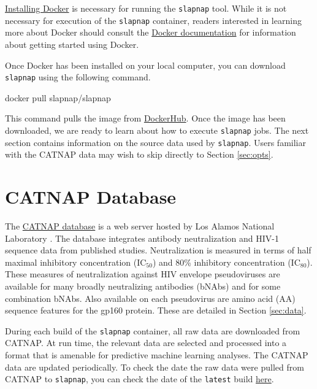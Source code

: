 \documentclass[]{article}
\newenvironment{Shaded}{\begin{snugshade}}{\end{snugshade}}
\newcommand{\ExtensionTok}[1]{#1}
\newcommand{\NormalTok}[1]{#1}
\begin{document}
\href{https://docs.docker.com/docker-for-windows/install/}{Installing
Docker} is necessary for running the \texttt{slapnap} tool. While it is
not necessary for execution of the \texttt{slapnap} container, readers
interested in learning more about Docker should consult the
\href{https://docs.docker.com/get-started/}{Docker documentation} for
information about getting started using Docker.

Once Docker has been installed on your local computer, you can download
\texttt{slapnap} using the following command.

\begin{Shaded}
\begin{Highlighting}[]
\ExtensionTok{docker}\NormalTok{ pull slapnap/slapnap}
\end{Highlighting}
\end{Shaded}

This command pulls the image from
\href{https://hub.docker.com/}{DockerHub}. Once the image has been
downloaded, we are ready to learn about how to execute \texttt{slapnap}
jobs. The next section contains information on the source data used by
\texttt{slapnap}. Users familiar with the CATNAP data may wish to skip
directly to Section \ref{sec:opts}.

\section{CATNAP Database}\label{sec:catnap}

The
\href{https://www.hiv.lanl.gov/components/sequence/HIV/neutralization/index.html}{CATNAP
database} is a web server hosted by Los Alamos National Laboratory
\citep{yoon2015catnap}. The database integrates antibody neutralization
and HIV-1 sequence data from published studies. Neutralization is
measured in terms of half maximal inhibitory concentration (IC\(_50\))
and 80\% inhibitory concentration (IC\(_80\)). These measures of
neutralization against HIV envelope pseudoviruses are available for many
broadly neutralizing antibodies (bNAbs) and for some combination bNAbs.
Also available on each pseudovirus are amino acid (AA) sequence features
for the gp160 protein. These are detailed in Section \ref{sec:data}.

During each build of the \texttt{slapnap} container, all raw data are
downloaded from CATNAP. At run time, the relevant data are selected and
processed into a format that is amenable for predictive machine learning
analyses. The CATNAP data are updated periodically. To check the date
the raw data were pulled from CATNAP to \texttt{slapnap}, you can check
the date of the \texttt{latest} build
\href{https://hub.docker.com/repository/registry-1.docker.io/slapnap/slapnap/tags?page=1}{here}.
\end{document}
